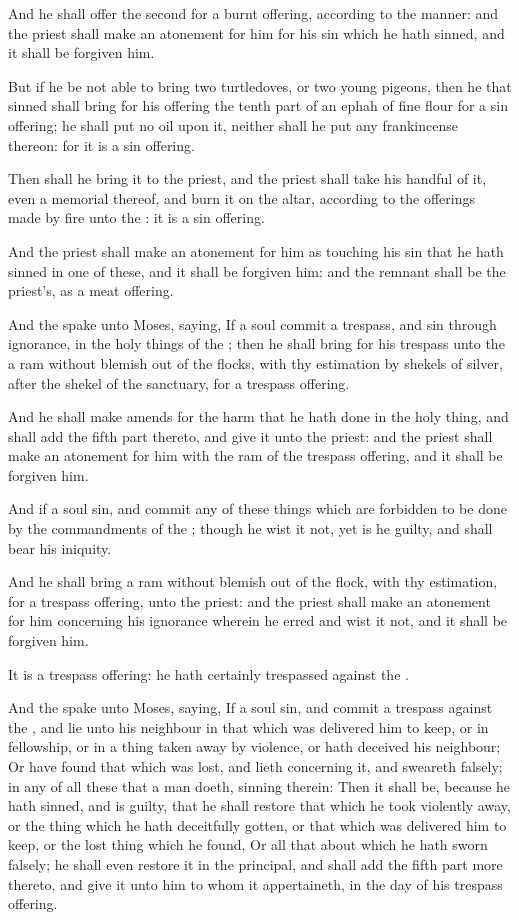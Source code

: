 \Verse And he shall offer the second for a burnt offering, according to the manner: and the priest shall make an atonement for him for his sin which he hath sinned, and it shall be forgiven him.

\Verse But if he be not able to bring two turtledoves, or two young pigeons, then he that sinned shall bring for his offering the tenth part of an ephah of fine flour for a sin offering; he shall put no oil upon it, neither shall he put any frankincense thereon: for it is a sin offering.

\Verse Then shall he bring it to the priest, and the priest shall take his handful of it, even a memorial thereof, and burn it on the altar, according to the offerings made by fire unto the \LORD: it is a sin offering.

\Verse And the priest shall make an atonement for him as touching his sin that he hath sinned in one of these, and it shall be forgiven him: and the remnant shall be the priest's, as a meat offering.

\Verse And the \LORD spake unto Moses, saying, \Verse If a soul commit a trespass, and sin through ignorance, in the holy things of the \LORD; then he shall bring for his trespass unto the \LORD a ram without blemish out of the flocks, with thy estimation by shekels of silver, after the shekel of the sanctuary, for a trespass offering.

\Verse And he shall make amends for the harm that he hath done in the holy thing, and shall add the fifth part thereto, and give it unto the priest: and the priest shall make an atonement for him with the ram of the trespass offering, and it shall be forgiven him.

\Verse And if a soul sin, and commit any of these things which are forbidden to be done by the commandments of the \LORD; though he wist it not, yet is he guilty, and shall bear his iniquity.

\Verse And he shall bring a ram without blemish out of the flock, with thy estimation, for a trespass offering, unto the priest: and the priest shall make an atonement for him concerning his ignorance wherein he erred and wist it not, and it shall be forgiven him.

\Verse It is a trespass offering: he hath certainly trespassed against the \LORD.

\Chapter
\Verse And the \LORD spake unto Moses, saying, \Verse If a soul sin, and commit a trespass against the \LORD, and lie unto his neighbour in that which was delivered him to keep, or in fellowship, or in a thing taken away by violence, or hath deceived his neighbour; \Verse Or have found that which was lost, and lieth concerning it, and sweareth falsely; in any of all these that a man doeth, sinning therein: \Verse Then it shall be, because he hath sinned, and is guilty, that he shall restore that which he took violently away, or the thing which he hath deceitfully gotten, or that which was delivered him to keep, or the lost thing which he found, \Verse Or all that about which he hath sworn falsely; he shall even restore it in the principal, and shall add the fifth part more thereto, and give it unto him to whom it appertaineth, in the day of his trespass offering.

